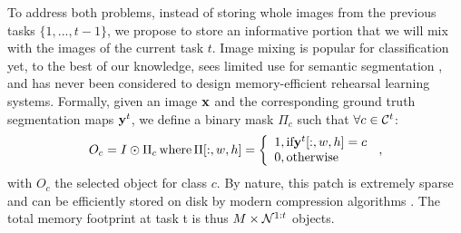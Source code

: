 To address both problems, instead of storing whole images from the previous tasks $\{1, ..., t-1\}$,
we propose to store an informative portion that we will mix with the images of the current task $t$.
Image mixing is popular for classification
\citep{hingyi2018mixup,yun2019cutmix,dabouei2020supermix,verma2019manifoldmixup,li2021moex,rame2021mixmo}
yet, to the best of our knowledge, sees limited use for semantic segmentation
\citep{fang2019instaboost,olsson2021classmix,zhang2021objectaug,tranheden2021dacs,ghiasi2020simplecopypaste},
and has never been considered to design memory-efficient rehearsal learning systems. Formally, given
an image $\mathbf{x}$ and the corresponding ground truth segmentation maps $\mathbf{y}^t$, we define a binary mask
$\Pi_c$  such that $\forall c \in \mathcal{C}^t$:
%
\begin{equation}
    O_c = I \odot \Pi_c\,\text{where}\,\Pi[:, w, h] = \left\{\begin{array}{l}
        1, \text{if} \mathbf{y}^t[:,w, h] = c \\
        0, \text{otherwise}
    \end{array}\right.\,,
    \label{eq:seg_mask_object}
\end{equation}
%
\noindent with $O_c$ the selected object for class $c$. By nature, this patch is extremely sparse
and can be efficiently stored on disk by modern compression algorithms \citep{ISO)10918}. The total
memory footprint at task t is thus $M \times \mathcal{N}^{1:t}$ objects.

